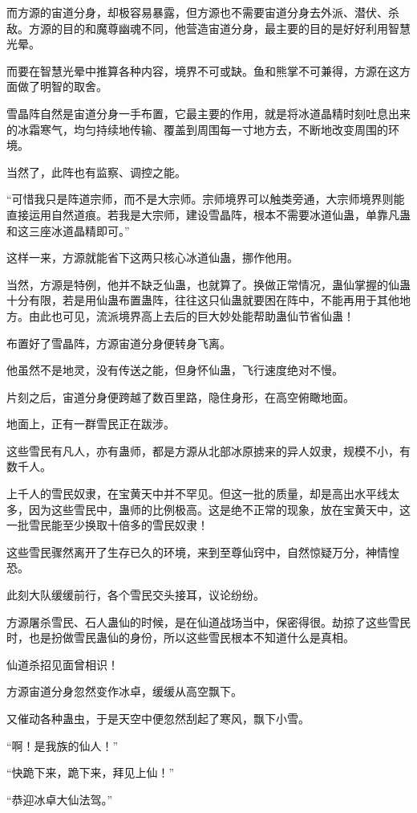 \begin{this_body}
而方源的宙道分身，却极容易暴露，但方源也不需要宙道分身去外派、潜伏、杀敌。方源的目的和魔尊幽魂不同，他营造宙道分身，最主要的目的是好好利用智慧光晕。

而要在智慧光晕中推算各种内容，境界不可或缺。鱼和熊掌不可兼得，方源在这方面做了明智的取舍。

雪晶阵自然是宙道分身一手布置，它最主要的作用，就是将冰道晶精时刻吐息出来的冰霜寒气，均匀持续地传输、覆盖到周围每一寸地方去，不断地改变周围的环境。

当然了，此阵也有监察、调控之能。

“可惜我只是阵道宗师，而不是大宗师。宗师境界可以触类旁通，大宗师境界则能直接运用自然道痕。若我是大宗师，建设雪晶阵，根本不需要冰道仙蛊，单靠凡蛊和这三座冰道晶精即可。”

这样一来，方源就能省下这两只核心冰道仙蛊，挪作他用。

当然，方源是特例，他并不缺乏仙蛊，也就算了。换做正常情况，蛊仙掌握的仙蛊十分有限，若是用仙蛊布置蛊阵，往往这只仙蛊就要困在阵中，不能再用于其他地方。由此也可见，流派境界高上去后的巨大妙处能帮助蛊仙节省仙蛊！

布置好了雪晶阵，方源宙道分身便转身飞离。

他虽然不是地灵，没有传送之能，但身怀仙蛊，飞行速度绝对不慢。

片刻之后，宙道分身便跨越了数百里路，隐住身形，在高空俯瞰地面。

地面上，正有一群雪民正在跋涉。

这些雪民有凡人，亦有蛊师，都是方源从北部冰原掳来的异人奴隶，规模不小，有数千人。

上千人的雪民奴隶，在宝黄天中并不罕见。但这一批的质量，却是高出水平线太多，因为这些雪民中，蛊师的比例极高。这是绝不正常的现象，放在宝黄天中，这一批雪民能至少换取十倍多的雪民奴隶！

这些雪民骤然离开了生存已久的环境，来到至尊仙窍中，自然惊疑万分，神情惶恐。

此刻大队缓缓前行，各个雪民交头接耳，议论纷纷。

方源屠杀雪民、石人蛊仙的时候，是在仙道战场当中，保密得很。劫掠了这些雪民时，也是扮做雪民蛊仙的身份，所以这些雪民根本不知道什么是真相。

仙道杀招见面曾相识！

方源宙道分身忽然变作冰卓，缓缓从高空飘下。

又催动各种蛊虫，于是天空中便忽然刮起了寒风，飘下小雪。

“啊！是我族的仙人！”

“快跪下来，跪下来，拜见上仙！”

“恭迎冰卓大仙法驾。”


\end{this_body}
